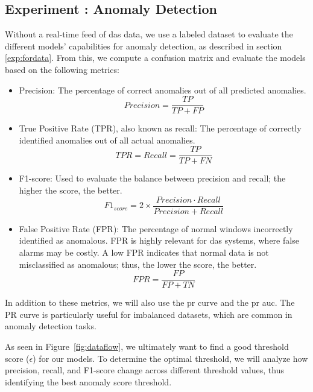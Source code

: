\subsection{Experiment : Anomaly Detection}
Without a real-time feed of \acrshort{das} data, we use a labeled dataset to evaluate the different models' capabilities for anomaly detection, as described in section \ref{exp:fordata}. From this, we compute a confusion matrix and evaluate the models based on the following metrics:

\begin{itemize}
    \item Precision: The percentage of correct anomalies out of all predicted anomalies.
    \begin{equation}
        Precision = \frac{TP}{TP + FP}
    \end{equation}

    \item True Positive Rate (TPR), also known as recall: The percentage of correctly identified anomalies out of all actual anomalies.
    \begin{equation}
        TPR = Recall = \frac{TP}{TP + FN}
    \end{equation}

    \item F1-score: Used to evaluate the balance between precision and recall; the higher the score, the better. 
    \begin{equation}
        F1_{score} = 2 \times \frac{Precision \cdot Recall}{Precision + Recall}
    \end{equation}

    \item False Positive Rate (FPR): The percentage of normal windows incorrectly identified as anomalous. FPR is highly relevant for \acrshort{das} systems, where false alarms may be costly. A low FPR indicates that normal data is not misclassified as anomalous; thus, the lower the score, the better.
    \begin{equation}
        FPR = \frac{FP}{FP + TN}
    \end{equation}
\end{itemize}

In addition to these metrics, we will also use the \acrfull{pr} curve and the \acrshort{pr} \acrfull{auc}. The PR curve is particularly useful for imbalanced datasets, which are common in anomaly detection tasks.

As seen in Figure~\ref{fig:dataflow}, we ultimately want to find a good threshold score ($\epsilon$) for our models. To determine the optimal threshold, we will analyze how precision, recall, and F1-score change across different threshold values, thus identifying the best anomaly score threshold.

